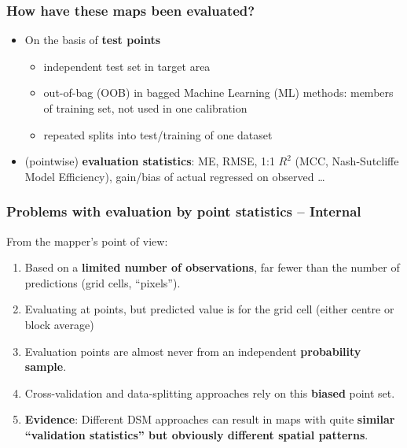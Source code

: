 \documentclass[aspectratio=169, 10pt]{beamer}
\begin{document}

\begin{frame}
  \frametitle{How have these maps been evaluated?}
    \begin{itemize}
        \item On the basis of \textbf{test points}
        \begin{itemize}
            \item independent test set in target area
            \item out-of-bag (OOB) in bagged Machine Learning (ML) methods: members of training set, not used in one calibration
            \item repeated splits into test/training of one dataset
        \end{itemize}
        \item (pointwise) \textbf{evaluation statistics}: ME, RMSE,
          1:1 $R^2$ (MCC, Nash-Sutcliffe Model Efficiency), gain/bias
          of actual regressed on observed \ldots
    \end{itemize}
\end{frame}


\begin{frame}
  \frametitle{Problems with evaluation by point statistics -- Internal}
From the mapper's point of view:
\begin{enumerate}
    \item Based on a \textbf{limited number of observations}, far fewer than the number of predictions (grid cells, ``pixels'').
    \item Evaluating at points, but predicted value is for the grid cell (either centre or block average)
    \item Evaluation points are almost never from an independent  \textbf{probability sample}.
  \item Cross-validation and data-splitting approaches rely on this \textbf{biased} point set.
  \item \textbf{Evidence}: Different DSM approaches can result in maps with quite \textbf{similar ``validation statistics'' but obviously different spatial patterns}.
  \end{enumerate}
  
\end{frame}
\end{document}
